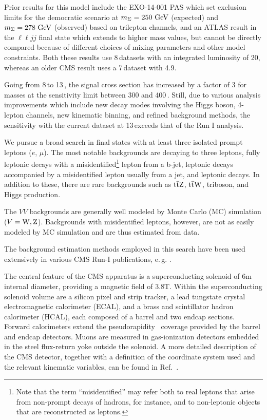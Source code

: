 Prior results for this model include the EXO-14-001 PAS \cite{CMS-PAS-EXO-14-001} which set exclusion limits for the democratic scenario at $m_\Sigma = 250\,\,\text{Ge\hspace{-.08em}V}$ (expected) and $m_\Sigma = 278\,\,\text{Ge\hspace{-.08em}V}$ (observed) based on trilepton channels, and an ATLAS result in the $\ell\ell jj$ final state \cite{ATLAS-CERN-PH-EP-2015-094} which extends to higher mass values, but cannot be directly compared because of different choices of mixing parameters and other model constraints. Both these results use 8\,\TeV datasets with an integrated luminosity of 20\fbinv, whereas an older CMS result uses a 7\,\TeV dataset with 4.9\fbinv \cite{CMS-PAPER-EXO-11-073}.

Going from 8\,\TeV to 13\,\TeV, the signal cross section has increased by a factor of 3 for masses at the sensitivity limit between 300 and 400\,\GeV. Still, due to various analysis improvements which include new decay modes involving the Higgs boson, 4-lepton channels, new kinematic binning, and refined background methods, the sensitivity with the current \fullLumi dataset at 13\,\TeV exceeds that of the Run I analysis.

We pursue a broad search in final states with at least three isolated prompt leptons ($e$, $\mu$). The most notable backgrounds are \WZ decaying to three leptons, fully leptonic \ttbar decays with a misidentified\footnote{Note that the term ``misidentified'' may refer both to real leptons that arise from non-prompt decays of hadrons, for instance, and to non-leptonic objects that are reconstructed as leptons.} lepton from a b-jet, leptonic \Z decays accompanied by a misidentified lepton usually from a jet, and leptonic \ZZ decays. In addition to these, there are rare backgrounds such as $\mathrm{t}\overline{\mathrm{t}}\mathrm{Z}$, $\mathrm{t}\overline{\mathrm{t}}\mathrm{W}$, triboson, and Higgs production.

The $VV$ backgrounds are generally well modeled by Monte Carlo (MC) simulation ($V = \mathrm{W}, \mathrm{Z}$). Backgrounds with misidentified leptons, however, are not as easily modeled by MC simulation and are thus estimated from data.

The background estimation methods employed in this search have been used extensively in various CMS Run-I publications, e.\,g. \cite{Chatrchyan:2013xsw,Chatrchyan:2014aea,Khachatryan:2014mma,Khachatryan:2014jya}.

The central feature of the CMS apparatus is a superconducting solenoid of 6\unit{m} internal diameter, providing a magnetic field of 3.8\unit{T}. Within the superconducting solenoid volume are a silicon pixel and strip tracker, a lead tungstate crystal electromagnetic calorimeter (ECAL), and a brass and scintillator hadron calorimeter (HCAL), each composed of a barrel and two endcap sections. Forward calorimeters extend the pseudorapidity~\cite{Chatrchyan:2008zzk} coverage provided by the barrel and endcap detectors. Muons are measured in gas-ionization detectors embedded in the steel flux-return yoke outside the solenoid. A more detailed description of the CMS detector, together with a definition of the coordinate system used and the relevant kinematic variables, can be found in Ref.~\cite{Chatrchyan:2008zzk}.
